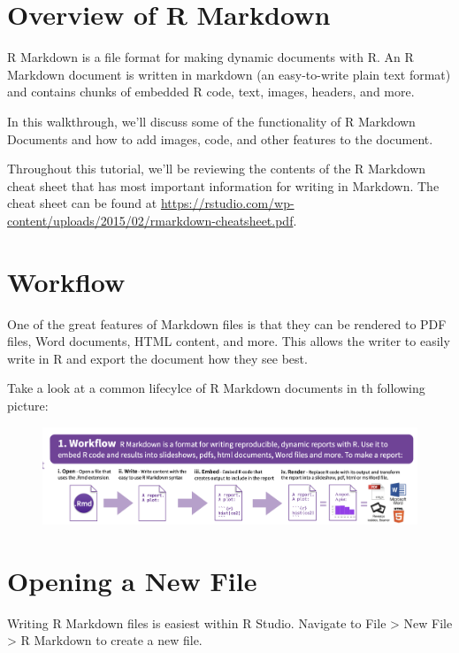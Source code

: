 \documentclass[]{book}
\begin{document}
\section{Overview of R Markdown}\label{overview-of-r-markdown}

R Markdown is a file format for making dynamic documents with R. An R
Markdown document is written in markdown (an easy-to-write plain text
format) and contains chunks of embedded R code, text, images, headers,
and more.

In this walkthrough, we'll discuss some of the functionality of R
Markdown Documents and how to add images, code, and other features to
the document.

Throughout this tutorial, we'll be reviewing the contents of the R
Markdown cheat sheet that has most important information for writing in
Markdown. The cheat sheet can be found at
\url{https://rstudio.com/wp-content/uploads/2015/02/rmarkdown-cheatsheet.pdf}.

\section{Workflow}\label{workflow}

One of the great features of Markdown files is that they can be rendered
to PDF files, Word documents, HTML content, and more. This allows the
writer to easily write in R and export the document how they see best.

Take a look at a common lifecylce of R Markdown documents in th
following picture:

\begin{figure}
\centering
\includegraphics{images/workflow.png}
\caption{}
\end{figure}

\section{Opening a New File}\label{opening-a-new-file}

Writing R Markdown files is easiest within R Studio. Navigate to File
\textgreater{} New File \textgreater{} R Markdown to create a new file.
\end{document}
